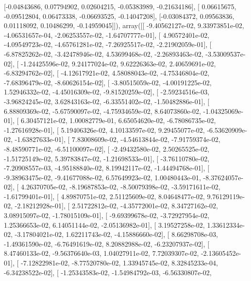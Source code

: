 \documentclass{article}
\begin{document}
       [-0.04843686,  0.07794902,  0.02604215, -0.05383989, -0.21634186],
       [ 0.06615675, -0.09512804,  0.06473338, -0.06693525, -0.14047208],
       [-0.03084372,  0.09563836,  0.01118092,  0.10486299, -0.14959045]]), array([[ -9.40562127e-02,   9.33973851e-02,  -4.06531657e-04,
         -2.06253557e-02,  -1.64707777e-01],
       [  4.90572401e-02,  -4.09549723e-02,  -4.65761281e-02,
         -7.26925517e-02,  -2.21902059e-01],
       [ -6.87825262e-02,  -3.42478946e-02,   4.53699468e-02,
         -2.26893463e-02,  -3.53009537e-02],
       [ -1.24425596e-02,   9.24177024e-02,   9.62226363e-02,
          2.40659691e-02,  -6.83294762e-02],
       [ -4.12617921e-02,   4.58088043e-02,  -4.75346804e-02,
         -7.68396479e-02,  -8.60626154e-02],
       [ -3.80515059e-02,  -4.00191225e-02,   1.52946332e-02,
         -4.45016309e-02,  -9.81520259e-02],
       [ -2.59234516e-03,  -3.96824245e-02,   3.62843163e-02,
         -6.33551402e-02,  -1.50482886e-01],
       [  6.88809369e-02,  -5.67590097e-02,  -4.75934659e-02,
          8.64073860e-02,  -1.04325069e-01],
       [  6.30457121e-02,   1.00082779e-01,   6.65054620e-02,
         -6.78086735e-02,  -1.27616928e-01],
       [  5.19406326e-02,   4.10133597e-02,   9.29455077e-02,
         -6.53620909e-02,  -1.63827633e-01],
       [  7.83008609e-02,  -4.54613844e-02,  -7.91759374e-02,
         -8.48590771e-02,  -6.51100097e-02],
       [ -2.49432580e-02,   2.50265525e-02,  -1.51725149e-02,
          5.39783847e-02,  -1.21698533e-01],
       [ -3.76110780e-02,  -7.20908557e-03,  -4.95188840e-02,
          8.19942117e-02,  -1.44494768e-01],
       [ -9.38963475e-02,  -9.41677088e-02,   6.57649923e-02,
          1.00480443e-01,  -8.37624057e-02],
       [  4.26370705e-02,  -8.19687853e-02,  -8.50079398e-02,
         -3.59171611e-02,  -1.61799401e-01],
       [  4.89870751e-02,   2.51125609e-02,   8.04648477e-02,
          9.76129119e-02,  -2.18212928e-01],
       [  2.51722812e-02,  -4.35772001e-02,   8.34727162e-02,
          3.08915097e-02,  -1.78015109e-01],
       [ -9.69399678e-02,  -3.72927954e-02,   1.25366653e-02,
          6.14051144e-02,  -2.05136982e-01],
       [  3.19527258e-02,   1.33612334e-02,  -3.17804021e-02,
          1.62211743e-02,  -4.15886660e-02],
       [  8.66298708e-03,  -1.49361590e-02,  -6.76491619e-02,
          8.20882988e-02,  -6.23207937e-02],
       [  8.47460133e-02,  -9.56376640e-03,   1.04027911e-02,
          7.72039307e-02,  -2.13605452e-01],
       [ -7.12822981e-02,  -8.77520780e-02,   1.33945745e-02,
          8.32845233e-04,  -6.34238522e-02],
       [ -1.25343583e-02,  -1.54984792e-03,  -6.56330807e-02,
\end{document}
